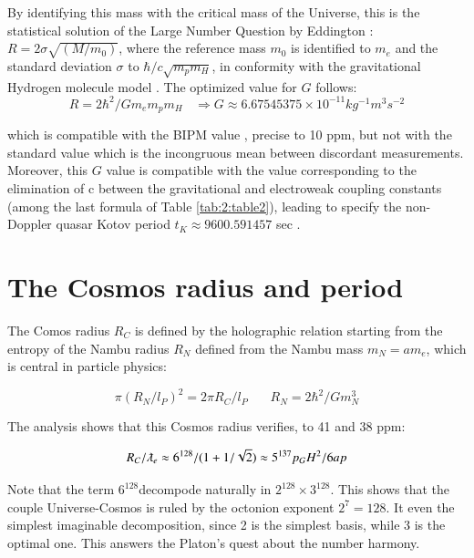 \documentclass[a4paper,9pt]{article}
\begin{document}
By identifying this mass with the critical mass of the Universe, this is the statistical solution \cite{Durham} of the Large Number Question by Eddington  : $R = 2 \sigma \sqrt{(M/m_0)}$, where the reference mass $m_0$ is identified to $m_e$ and the standard deviation $\sigma$ to $\hbar/c\sqrt{m_pm_H}$, in conformity with the gravitational Hydrogen molecule model \cite{Sanchez}. The optimized value for $G$ follows:
\begin{equation}
R = 2\hbar^2/Gm_em_pm_H  ~~~~  \Rightarrow G \approx 6.67545375 \times 10^{-11}  kg^{-1}m^{3}s^{-2}    
\end{equation}

which is compatible with the BIPM value \cite{Quinn}, precise to 10 ppm, but not with the standard value \cite{Nist} which is the incongruous mean between discordant measurements. Moreover, this $G$ value is compatible with the value corresponding to the elimination of c between the gravitational and electroweak coupling constants (among the last formula of Table \ref{tab:2:table2}), leading to specify the non-Doppler quasar Kotov period $t_K \approx 9600.591457$ sec \cite{Sanchez}.


\section{The Cosmos radius and period}

The Comos radius $R_C$ is defined by the holographic relation starting from the entropy of the Nambu radius $R_N$ defined from the Nambu mass $m_N = am_e$, which is central in particle physics:

\begin{equation}
\pi (R_N/l_P)^2 = 2\pi R_C/l_P ~~~~~~~~   R_N = 2\hbar^2/ Gm_N^3
\end{equation}

The analysis shows that this Cosmos radius verifies, to 41 and 38 ppm:

\begin{equation}
R_C/\lambdabar_e \approx 6^{128}/(1+1/\sqrt2) \approx 5^{137} p_GH^2/6ap
\end{equation}

Note that the term $6^{128}$decompode naturally in $2^{128} \times 3^{128}$. This shows that the couple Universe-Cosmos is ruled by the octonion exponent $2^7 = 128$. It even the simplest imaginable decomposition, since 2 is the simplest basis, while 3 is the optimal one. This answers the Platon's quest about the number harmony. 
\end{document}
